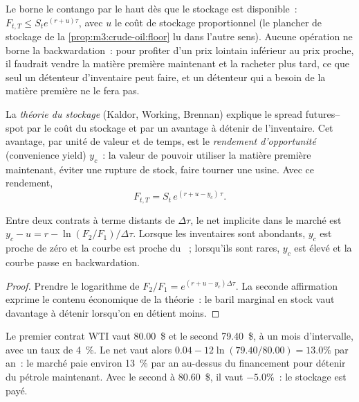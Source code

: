 Le  borne le contango par le haut dès que le stockage est disponible~: $F_{t,T} \le
S_t e^{(r+u)\tau}$, avec $u$ le coût de stockage proportionnel (le plancher de stockage de
la \cref{prop:m3:crude-oil:floor} lu dans l'autre sens). Aucune opération ne borne la backwardation~: pour profiter
d'un prix lointain inférieur au prix proche, il faudrait vendre la matière première maintenant et la racheter plus tard,
ce que seul un détenteur d'inventaire peut faire, et un détenteur qui a besoin de la matière première ne le fera pas.

\begin{definition}\label{def:m3:forward-curves-storage-and-convenience-yield:storage}
La \emph{théorie du stockage} (Kaldor, Working, Brennan) explique le
spread futures--spot par le coût du stockage et par un avantage à détenir de l'inventaire. Cet avantage, par
unité de valeur et de temps, est le \emph{rendement d'opportunité} (convenience yield) $y_c$~: la valeur de
pouvoir utiliser la matière première maintenant, éviter une rupture de stock, faire tourner une usine. Avec ce rendement,
\[
F_{t,T} = S_t\,e^{(r + u - y_c)\,\tau}.
\]
\end{definition}

\begin{proposition}\label{prop:m3:forward-curves-storage-and-convenience-yield:inventory}
Entre deux contrats à terme distants de $\Delta\tau$, le  net implicite dans le marché est
$y_c - u = r - \ln(F_2/F_1)/\Delta\tau$. Lorsque les inventaires sont abondants, $y_c$ est proche de zéro et la courbe
est proche du ~; lorsqu'ils sont rares, $y_c$ est élevé et la courbe passe en backwardation.
\end{proposition}

\begin{proof}
Prendre le logarithme de $F_2/F_1 = e^{(r + u - y_c)\Delta\tau}$. La seconde affirmation exprime le contenu économique
de la théorie~: le baril marginal en stock vaut davantage à détenir lorsqu'on en détient moins.
\end{proof}

\begin{example}\label{ex:m3:forward-curves-storage-and-convenience-yield:read}
Le premier contrat WTI vaut 80.00~\$ et le second 79.40~\$, à un mois d'intervalle, avec un taux de 4~\%.
Le  net vaut alors $0.04 - 12\ln(79.40/80.00) = 13.0\%$ par an~: le marché paie environ 13~\%
par an au-dessus du financement pour détenir du pétrole maintenant. Avec le second à 80.60~\$, il vaut $-5.0\%$~: le stockage est
payé.
\end{example}

